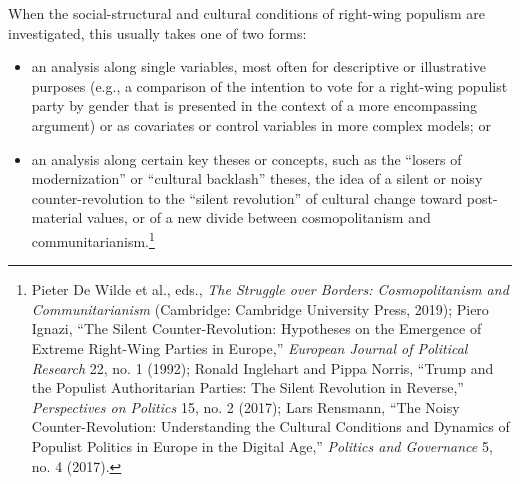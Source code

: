 \documentclass{tufte-handout}
\begin{document}
When the social-structural and cultural conditions of right-wing
populism are investigated, this usually takes one of two forms:

\begin{itemize}
\item
  an analysis along single variables, most often for descriptive or
  illustrative purposes (e.g., a comparison of the intention to vote for
  a right-wing populist party by gender that is presented in the context
  of a more encompassing argument) or as covariates or control variables
  in more complex models; or
\item
  an analysis along certain key theses or concepts, such as the ``losers
  of modernization'' or ``cultural backlash'' theses, the idea of a
  silent or noisy counter-revolution to the ``silent revolution'' of
  cultural change toward post-material values, or of a new divide
  between cosmopolitanism and communitarianism.\footnote{Pieter De Wilde
    et al., eds., \emph{The Struggle over Borders: Cosmopolitanism and
    Communitarianism} (Cambridge: Cambridge University Press, 2019);
    Piero Ignazi, ``The Silent Counter-Revolution: Hypotheses on the
    Emergence of Extreme Right-Wing Parties in Europe,'' \emph{European
    Journal of Political Research} 22, no. 1 (1992); Ronald Inglehart
    and Pippa Norris, ``Trump and the Populist Authoritarian Parties:
    The Silent Revolution in Reverse,'' \emph{Perspectives on Politics}
    15, no. 2 (2017); Lars Rensmann, ``The Noisy Counter-Revolution:
    Understanding the Cultural Conditions and Dynamics of Populist
    Politics in Europe in the Digital Age,'' \emph{Politics and
    Governance} 5, no. 4 (2017).\vspace{.08in}}
\end{itemize}
\end{document}

